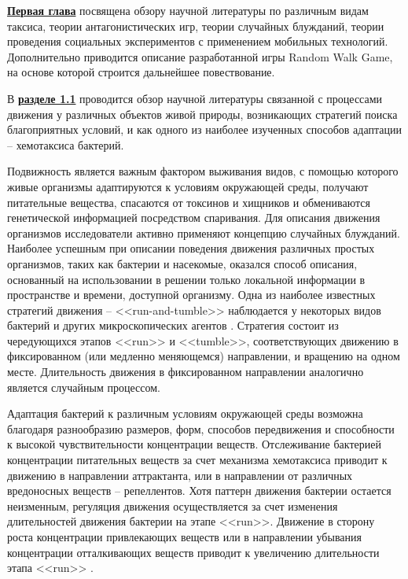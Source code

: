 \underline{\textbf{Первая глава}} посвящена обзору научной литературы по различным видам таксиса, теории антагонистических игр, теории случайных блужданий, теории проведения социальных экспериментов с применением мобильных технологий. Дополнительно приводится описание разработанной игры Random Walk Game, на основе которой строится дальнейшее повествование.

В \underline{\textbf{разделе 1.1}} проводится обзор научной литературы связанной с процессами движения у различных объектов живой природы, возникающих стратегий поиска благоприятных условий, и как одного из наиболее изученных способов адаптации -- хемотаксиса бактерий. 

Подвижность является важным фактором выживания видов, с помощью которого живые организмы адаптируются к условиям окружающей среды, получают питательные вещества, спасаются от токсинов и хищников и обмениваются генетической информацией посредством спаривания. Для описания движения организмов исследователи активно применяют концепцию случайных блужданий. Наиболее успешным при описании поведения движения различных простых организмов, таких как бактерии и насекомые, оказался способ описания, основанный на использовании в решении только локальной информации в пространстве и времени, доступной организму. Одна из наиболее известных стратегий движения -- <<run-and-tumble>> наблюдается у некоторых видов бактерий и других микроскопических агентов \cite{berg_coli_2004}. Стратегия состоит из чередующихся этапов <<run>> и <<tumble>>, соответствующих движению в фиксированном (или медленно меняющемся) направлении, и вращению на одном месте. Длительность движения в фиксированном направлении аналогично является случайным процессом.

Адаптация бактерий к различным условиям окружающей среды возможна благодаря разнообразию размеров, форм, способов передвижения и способности к высокой чувствительности концентрации веществ. Отслеживание бактерией концентрации питательных веществ за счет механизма хемотаксиса приводит к движению в направлении аттрактанта, или в направлении от различных вредоносных веществ -- репеллентов. Хотя паттерн движения бактерии остается неизменным, регуляция движения осуществляется за счет изменения длительностей движения бактерии на этапе <<run>>. Движение в сторону роста концентрации привлекающих веществ или в направлении убывания концентрации отталкивающих веществ приводит к увеличению длительности этапа <<run>> \cite{berg_chemotaxis_1972}.

